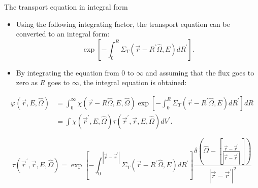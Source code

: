 \documentclass{beamer}
\begin{document}
\begin{frame}{The transport equation in integral form}

  \begin{itemize}
    \item Using the following integrating factor, the transport equation can
      be converted to an integral form: \newline
      \begin{equation*}
        \exp{\left[-\int_0^R \Sigma_T(\vec{r}-R^{'}\hat{\Omega},E)dR^{'} \right]}.
      \end{equation*}
    \item By integrating the equation from 0 to $\infty$ and assuming that the
      flux goes to zero as $R$ goes to $\infty$, the integral equation is
      obtained:
  \end{itemize}

  \begin{align}
    \varphi(\vec{r},E,\hat{\Omega}) & = 
    \int_0^{\infty} \chi(\vec{r} - R\hat{\Omega},E,\hat{\Omega})
    \exp{\left[-\int_0^R \Sigma_T(\vec{r}-R^{'}\hat{\Omega},E)dR^{'} \right]} 
    dR \nonumber \\
    & = \int \chi(\vec{r}^{'},E,\hat{\Omega}) 
    \tau(\vec{r}^{'},\vec{r},E,\hat{\Omega}) dV^{'}. \nonumber
  \end{align}

  \medskip

  \begin{equation*}
    \tau(\vec{r}^{'},\vec{r},E,\hat{\Omega})= 
    \exp{\left[-\int_0^{|\vec{r} - \vec{r}^{'}|} 
        \Sigma_T(\vec{r}-R^{'}\hat{\Omega},E)dR^{'} \right]} 
    \frac{\delta \left(\hat{\Omega} - \left[\frac{\vec{r} - \vec{r}^{'}}
        {|\vec{r} - \vec{r}^{'}|}\right]\right)}
         {|\vec{r} - \vec{r}^{'}|^2}
  \end{equation*}

\end{frame}
\end{document}
